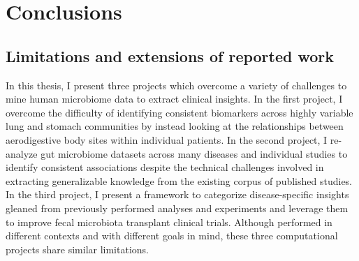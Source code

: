 \chapter{Conclusions}

\section{Limitations and extensions of reported work}

In this thesis, I present three projects which overcome a variety of challenges to mine human microbiome data to extract clinical insights.
In the first project, I overcome the difficulty of identifying consistent biomarkers across highly variable lung and stomach communities by instead looking at the relationships between aerodigestive body sites within individual patients.
In the second project, I re-analyze gut microbiome datasets across many diseases and individual studies to identify consistent associations despite the technical challenges involved in extracting generalizable knowledge from the existing corpus of published studies.
In the third project, I present a framework to categorize disease-specific insights gleaned from previously performed analyses and experiments and leverage them to improve fecal microbiota transplant clinical trials.
Although performed in different contexts and with different goals in mind, these three computational projects share similar limitations.

